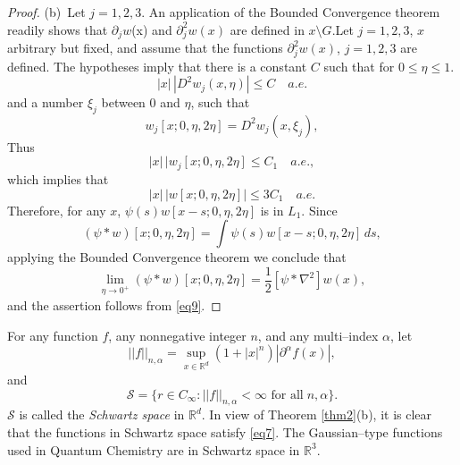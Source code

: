 \documentclass[english, reqno]{amsart}
\newcommand{\del}{\mbox{$\partial$}}
\newcommand{\half}{\mbox{$\frac{1}{2}$}}
\newcommand{\IR}{\text{${\mathbb{R}}$}}
\begin{document}
\begin{proof}
(b)\  Let $j=1,2,3$. An application of the Bounded Convergence theorem readily shows that $\del_jw$(x) and $\del^2_jw(x)$ are defined in $x\setminus G$.Let $j=1, 2, 3$, $x$ arbitrary but fixed, and assume that the functions $\del^2_jw(x)$, $j=1,2,3$ are defined.  The hypotheses imply that there is a constant $C$ such that for $0 \le \eta \le1$. 
\[
|x|\,|D^2w_j(x, \eta)| \le C \quad a.e.
\]
and a number $\xi_j$ between 0 and $\eta$, such that
\[
w_j[x; 0, \eta,2\eta]=D^2w_j(x, \xi_j),
\]
Thus
\[
|x|\,|w_j[x; 0, \eta,2\eta]\le C _1\quad a.e.,
\]
which implies that 
\[
|x|\,|w[x; 0, \eta,2\eta]|\le 3C_1 \quad a.e.
\]
Therefore, for any $x$, $\psi(s) w[x-s; 0, \eta, 2 \eta]$ is in $L_1$.
Since
\[
(\psi\ast w)[x; 0, \eta, 2 \eta]= \int \psi(s) w[x-s; 0, \eta, 2 \eta]\,ds,
\]
applying the Bounded Convergence theorem we conclude that
\[
\lim_{\eta \rightarrow 0^+}(\psi\ast w)[x; 0, \eta, 2 \eta]= \half [\psi\ast \nabla^2]w(x),
\]
and the assertion follows from \eqref{eq9}.
\end{proof}
For any function $f$, any nonnegative integer $n$, and any multi--index $\alpha$, let
\[
||f||_{n, \alpha}= \sup_{x \in \IR^d} (1+|x|^n)|\del^{\alpha}f(x)|,
\]
and
\[
\mathcal{S}=\{r \in C_{\infty} : ||f||_{n,\alpha} < \infty \text{ for all} \; n, \alpha\}.
\]
$\mathcal{S}$ is called the \emph{Schwartz space} in $\IR^d$. In view of Theorem \ref{thm2}(b), it is clear that the functions in  Schwartz space satisfy \eqref{eq7}.
The  Gaussian--type functions used in Quantum Chemistry are in Schwartz space in $\IR^3$.
\end{document}
